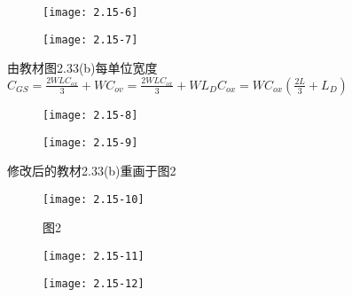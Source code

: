 \begin{figure}[H] %
	\begin{minipage}{\linewidth}
		\texttt{[image: 2.15-6]}
	\end{minipage}
\end{figure}


\begin{figure}[H] %
	\begin{minipage}{\linewidth}
		\texttt{[image: 2.15-7]}
	\end{minipage}
\end{figure}

由教材图2.33(b)每单位宽度$C_{GS}=\frac{2WLC_{ox}}{3}+WC_{ov}=\frac{2WLC_{ox}}{3}+WL_DC_{ox}=WC_{ox}(\frac{2L}{3}+L_D)$

\begin{figure}[H] %
	\begin{minipage}{\linewidth}
		\texttt{[image: 2.15-8]}
	\end{minipage}
\end{figure}


\begin{figure}[H] %
	\begin{minipage}{\linewidth}
		\texttt{[image: 2.15-9]}
	\end{minipage}
\end{figure}


修改后的教材2.33(b)重画于图2


		\begin{figure}[H] %
	\begin{minipage}{\linewidth}
		\texttt{[image: 2.15-10]}
	\end{minipage}
	\caption*{图2} %
\end{figure}



\begin{figure}[H] %
	\begin{minipage}{\linewidth}
		\texttt{[image: 2.15-11]}
	\end{minipage}
\end{figure}

\begin{figure}[H] %
	\begin{minipage}{\linewidth}
		\texttt{[image: 2.15-12]}
	\end{minipage}
\end{figure}


